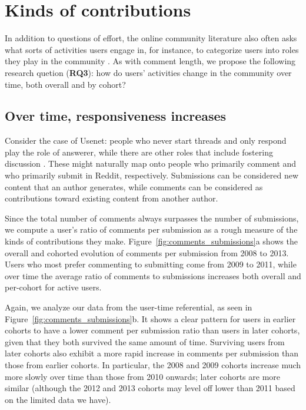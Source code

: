 \section{Kinds of contributions}

In addition to questions of effort, the online community literature also often asks what sorts of activities users engage in, for instance, to categorize users into roles they play in the community \cite{Welser2011}. As with comment length, we propose the following research quetion (\textbf{RQ3}): how do users' activities change in the community over time, both overall and by cohort?

\subsection{Over time, responsiveness increases}
Consider the case of Usenet: people who never start threads and only respond play the role of answerer, while there are other roles that include fostering discussion \cite{Welser2007}.  These might naturally map onto people who primarily comment and who primarily submit in Reddit, respectively.  Submissions can be considered new content that an author generates, while comments can be considered as contributions toward existing content from another author.

Since the total number of comments always surpasses the number of submissions, we compute a user's ratio of comments per submission as a rough measure of the kinds of contributions they make.  Figure~\ref{fig:comments_submissions}a shows the overall and cohorted evolution of comments per submission from 2008 to 2013.  Users who most prefer commenting to submitting come from 2009 to 2011, while over time the average ratio of comments to submissions increases both overall and per-cohort for active users.

Again, we analyze our data from the user-time referential, as seen in Figure~\ref{fig:comments_submissions}b. It shows a clear pattern for users in earlier cohorts to have a lower comment per submission ratio than users in later cohorts, given that they both survived the same amount of time.  Surviving users from later cohorts also exhibit a more rapid increase in comments per submission than those from earlier cohorts.  In particular, the 2008 and 2009 cohorts increase much more slowly over time than those from 2010 onwards; later cohorts are more similar (although the 2012 and 2013 cohorts may level off lower than 2011 based on the limited data we have). 

